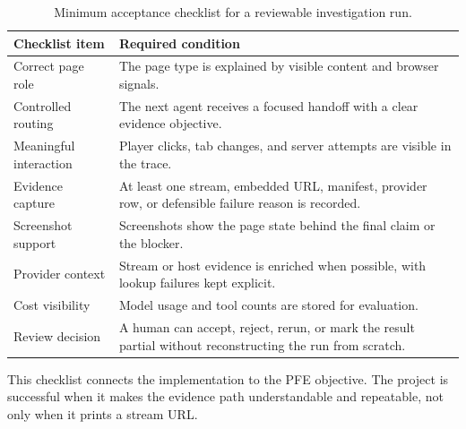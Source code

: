 \begin{table}[!htbp]
\centering
\begin{tabularx}{\textwidth}{Q{4.2cm}Y}
\toprule
{}
Checklist item & Required condition \\
\midrule
Correct page role & The page type is explained by visible content and browser
signals. \\
Controlled routing & The next agent receives a focused handoff with a clear
evidence objective. \\
Meaningful interaction & Player clicks, tab changes, and server attempts are
visible in the trace. \\
Evidence capture & At least one stream, embedded URL, manifest, provider row,
or defensible failure reason is recorded. \\
Screenshot support & Screenshots show the page state behind the final claim or
the blocker. \\
Provider context & Stream or host evidence is enriched when possible, with
lookup failures kept explicit. \\
Cost visibility & Model usage and tool counts are stored for evaluation. \\
Review decision & A human can accept, reject, rerun, or mark the result partial
without reconstructing the run from scratch. \\
\bottomrule
\end{tabularx}
\caption{Minimum acceptance checklist for a reviewable investigation run.}
\label{tab:runtime-acceptance-checklist}
\end{table}

This checklist connects the implementation to the PFE objective. The project is
successful when it makes the evidence path understandable and repeatable, not
only when it prints a stream URL.
